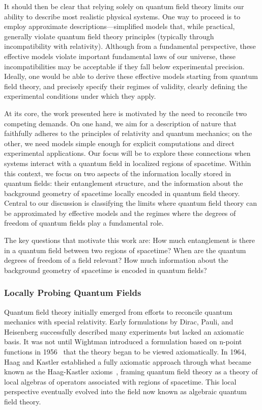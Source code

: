 \documentclass[letterpaper,12pt,titlepage,oneside,final]{book}
\begin{document}
It should then be clear that relying solely on quantum field theory limits our ability to describe most realistic physical systems. One way to proceed is to employ approximate descriptions---simplified models that, while practical, generally violate quantum field theory principles (typically through incompatibility with relativity). Although from a fundamental perspective, these effective models violate important fundamental laws of our universe, these incompatibilities may be acceptable if they fall below experimental precision. Ideally, one would be able to derive these effective models starting from quantum field theory, and precisely specify their regimes of validity, clearly defining the experimental conditions under which they apply.


At its core, the work presented here is motivated by the need to reconcile two competing demands. On one hand, we aim for a description of nature that faithfully adheres to the principles of relativity and quantum mechanics; on the other, we need models simple enough for explicit computations and direct experimental applications. Our focus will be to explore these connections when systems interact with a quantum field in localized regions of spacetime. Within this context, we focus on two aspects of the information locally stored in quantum fields: their entanglement structure, and the information about the background geometry of spacetime locally encoded in quantum field theory. Central to our discussion is classifying the limits where quantum field theory can be approximated by effective models and the regimes where the degrees of freedom of quantum fields play a fundamental role.


The key questions that motivate this work are: How much entanglement is there in a quantum field between two regions of spacetime? When are the quantum degrees of freedom of a field relevant? How much information about the background geometry of spacetime is encoded in quantum fields?





\subsubsection*{Locally Probing Quantum Fields}

Quantum field theory initially emerged from efforts to reconcile quantum mechanics with special relativity. Early formulations by Dirac, Pauli, and Heisenberg successfully described many experiments but lacked an axiomatic basis. It was not until Wightman introduced a formulation based on n-point functions in 1956~\cite{WightmanOG} that the theory began to be viewed axiomatically. In 1964, Haag and Kastler established a fully axiomatic approach through what became known as the Haag-Kastler axioms~\cite{HaagOG}, framing quantum field theory as a theory of local algebras of operators associated with regions of spacetime. This local perspective eventually evolved into the field now known as algebraic quantum field theory.
\end{document}
